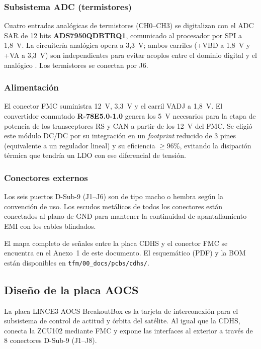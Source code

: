 \subsubsection{Subsistema ADC (termistores)}

Cuatro entradas analógicas de termistores (CH0--CH3) se digitalizan con el ADC SAR de
12 bits \textbf{ADS7950QDBTRQ1}, comunicado al procesador por SPI a 1,8~V. La circuitería
analógica opera a 3,3~V; ambos carriles (+VBD a 1,8~V y +VA a 3,3~V) son independientes
para evitar acoplos entre el dominio digital y el analógico \cite{ti2018ads7950}. Los
termistores se conectan por J6.

\subsubsection{Alimentación}

El conector FMC suministra 12~V, 3,3~V y el carril VADJ a 1,8~V. El convertidor conmutado
\textbf{R-78E5.0-1.0} genera los 5~V necesarios para la etapa de potencia de los transceptores
RS y CAN a partir de los 12~V del FMC. Se eligió este módulo DC/DC por su integración en
un \textit{footprint} reducido de 3 pines (equivalente a un regulador lineal) y su eficiencia $\geq
96\%$, evitando la disipación térmica que tendría un LDO con ese diferencial de tensión.

\subsubsection{Conectores externos}

Los seis puertos D-Sub-9 (J1--J6) son de tipo macho o hembra según la convención de uso.
Los escudos metálicos de todos los conectores están conectados al plano de GND para
mantener la continuidad de apantallamiento EMI con los cables blindados.

El mapa completo de señales entre la placa CDHS y el conector FMC se encuentra en el
Anexo~1 de este documento. El esquemático (PDF) y la BOM están disponibles en
\texttt{tfm/00\_docs/pcbs/cdhs/}.

\subsection{Diseño de la placa AOCS}

La placa LINCE3 AOCS BreakoutBox es la tarjeta de interconexión para el subsistema de
control de actitud y órbita del satélite. Al igual que la CDHS, conecta la ZCU102 mediante
FMC y expone las interfaces al exterior a través de 8 conectores D-Sub-9 (J1--J8).

